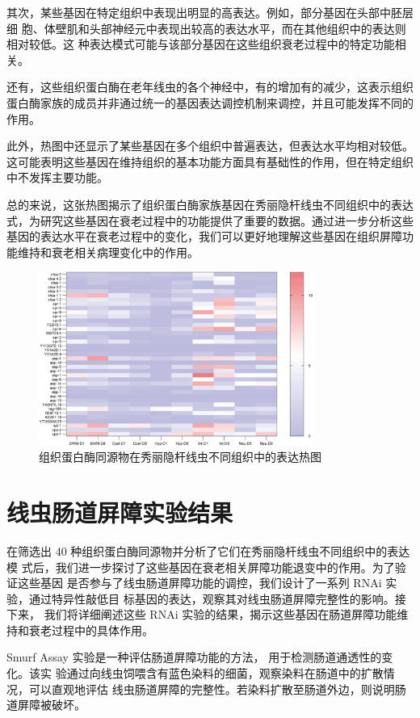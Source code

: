 其次，某些基因在特定组织中表现出明显的高表达。例如，部分基因在头部中胚层细 胞、体壁肌和头部神经元中表现出较高的表达水平，而在其他组织中的表达则相对较低。这 种表达模式可能与该部分基因在这些组织衰老过程中的特定功能相关。

还有，这些组织蛋白酶在老年线虫的各个神经中，有的增加有的减少，这表示组织蛋白酶家族的成员并非通过统一的基因表达调控机制来调控，并且可能发挥不同的作用。

此外，热图中还显示了某些基因在多个组织中普遍表达，但表达水平均相对较低。这可能表明这些基因在维持组织的基本功能方面具有基础性的作用，但在特定组织中不发挥主要功能。

总的来说，这张热图揭示了组织蛋白酶家族基因在秀丽隐杆线虫不同组织中的表达式，为研究这些基因在衰老过程中的功能提供了重要的数据。通过进一步分析这些基因的表达水平在衰老过程中的变化，我们可以更好地理解这些基因在组织屏障功能维持和衰老相关病理变化中的作用。

\begin{figure}[H]
    \centering
    \includegraphics[width=0.8\textwidth]{img/heatmap1.png}
    \caption{组织蛋白酶同源物在秀丽隐杆线虫不同组织中的表达热图}
    \label{fig:heatmap1}
\end{figure}

\section{线虫肠道屏障实验结果}

在筛选出 40 种组织蛋白酶同源物并分析了它们在秀丽隐杆线虫不同组织中的表达模 式后，我们进一步探讨了这些基因在衰老相关屏障功能退变中的作用。为了验证这些基因 是否参与了线虫肠道屏障功能的调控，我们设计了一系列 RNAi 实验，通过特异性敲低目 标基因的表达，观察其对线虫肠道屏障完整性的影响。接下来， 我们将详细阐述这些 RNAi 实验的结果，揭示这些基因在肠道屏障功能维持和衰老过程中的具体作用。

Smurf Assay 实验是一种评估肠道屏障功能的方法， 用于检测肠道通透性的变化。该实 验通过向线虫饲喂含有蓝色染料的细菌，观察染料在肠道中的扩散情况，可以直观地评估 线虫肠道屏障的完整性。若染料扩散至肠道外边，则说明肠道屏障被破坏。

